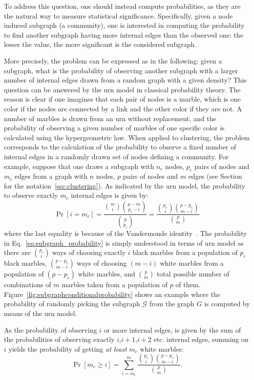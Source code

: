 To address this question, one should instead compute probabilities, as they are the natural way to measure statistical significance.
Specifically, given a node induced subgraph (a community), one is interested in computing the probability to find another subgraph having more internal edges than the observed one: the lesser the value, the more significant is the considered subgraph.

More precisely, the problem can be expressed as in the following: given a subgraph, what is the probability of observing another subgraph with a larger number of internal edges drawn from a random graph with a given density?
This question can be answered by the urn model in classical probability theory. The reason is clear if one imagines that each pair of nodes is a marble, which is one color if the nodes are connected by a link and the other color if they are not.
A number of marbles is drawn from an urn without replacement, and the probability of observing a given number of marbles of one specific color is calculated using the hypergeometric law.
When applied to clustering, the problem corresponds to the calculation of the probability to observe a fixed number of internal edges in a randomly drawn set of nodes defining a community.
For example, suppose that one draws a subgraph with $n_c$ nodes, $p_c$ pairs of nodes and $m_c$ edges from a graph with $n$ nodes, $p$ pairs of nodes and $m$ edges (see Section for the notation~\ref{sec:clustering}).
As indicated by the urn model, the probability to observe exactly $m_c$ internal edges is given by:
\begin{equation}\label{eq:subgraph_probability}
\Pr[i=m_c] = \frac{\binom{m}{i}\binom{p-m}{p_c-i} }{\binom{p}{p_c}} = \frac{\binom{p_c}{i} \binom{p-p_c}{m-i}}{\binom{p}{m}}
\end{equation}
where the last equality is because of the Vandermonde identity~\cite{feller1968}.
The probability in Eq.~\ref{eq:subgraph_probability} is simply understood in terms of urn model as there are $\binom{p_c}{i}$ ways of choosing exactly $i$ black marbles from a population of $p_c$ black marbles, $\binom{p-p_c}{m-i}$ ways of choosing $(m-i)$ white marbles from a population of $(p-p_c)$ white marbles, and $\binom{p}{m}$ total possible number of combinations of $m$ marbles taken from a population of $p$ of them. Figure~\ref{fig:subgraphconditionalprobability} shows an example where the probability of randomly picking the subgraph $\mathcal{G}$ from the graph $G$ is computed by means of the urn model.

As the probability of observing $i$ or more internal edges, is given by the sum of the probabilities of observing exactly $i$,$i+1$,$i+2$ etc. internal edges, summing on $i$ yields the probability of getting \emph{at least} $m_c$ white marbles:
\begin{equation}\label{eq:subgraph_probability_marginalized}
\Pr[ m_c \geq i ] = \sum\limits_{i=m_c}^{m} \frac{\binom{p_c}{i} \binom{p-p_c}{m-i}}{\binom{p}{m}}.
\end{equation}

